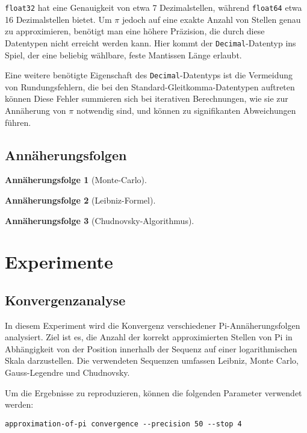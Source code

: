 \documentclass{scrartcl}
\newtheorem{approximation sequence}{Annäherungsfolge}
\begin{document}
\texttt{float32} hat eine Genauigkeit von etwa 7 Dezimalstellen, während
\texttt{float64} etwa 16 Dezimalstellen bietet.
Um \(\pi\) jedoch auf eine exakte Anzahl von Stellen genau zu approximieren,
benötigt man eine höhere Präzision, die durch diese Datentypen nicht erreicht
werden kann.
Hier kommt der \texttt{Decimal}-Datentyp ins Spiel, der eine beliebig wählbare,
feste Mantissen Länge erlaubt.

Eine weitere benötigte Eigenschaft des \texttt{Decimal}-Datentyps ist die
Vermeidung von Rundungsfehlern, die bei den Standard-Gleitkomma-Datentypen
auftreten können Diese Fehler summieren sich bei iterativen Berechnungen, wie
sie zur Annäherung von \(\pi\) notwendig sind, und können zu signifikanten
Abweichungen führen.

\subsection{Annäherungsfolgen}

\begin{approximation sequence}[Monte-Carlo]

\end{approximation sequence}

\begin{approximation sequence}[Leibniz-Formel]

\end{approximation sequence}

\begin{approximation sequence}[Chudnovsky-Algorithmus]

\end{approximation sequence}

\section{Experimente}

\subsection{Konvergenzanalyse}

In diesem Experiment wird die Konvergenz verschiedener Pi-Annäherungsfolgen
analysiert.
Ziel ist es, die Anzahl der korrekt approximierten Stellen von Pi in
Abhängigkeit von der Position innerhalb der Sequenz auf einer logarithmischen
Skala darzustellen.
Die verwendeten Sequenzen umfassen Leibniz, Monte Carlo, Gauss-Legendre und
Chudnovsky.

Um die Ergebnisse zu reproduzieren, können die folgenden Parameter verwendet
werden:
\begin{verbatim}
approximation-of-pi convergence --precision 50 --stop 4
\end{verbatim}
\end{document}
